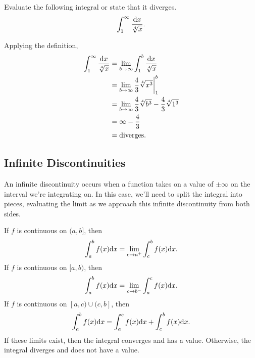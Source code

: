 \begin{example}
	Evaluate the following integral or state that it diverges.
	\begin{equation*}
		\int_{1}^{\infty}{\frac{\mathrm{d} x}{\sqrt[4]{x}}}.
	\end{equation*}
\end{example}
\begin{answer}
	Applying the definition,
	\begin{align*}
		\int_{1}^{\infty}{\frac{\mathrm{d} x}{\sqrt[4]{x}}} &= \lim_{b\to\infty}{\int_{1}^{b}{\frac{\mathrm{d} x}{\sqrt[4]{x}}}} \\
		&= \lim_{b\to\infty}{\frac{4}{3}\sqrt[4]{x^3}\biggr\rvert_{1}^{b}} \\
		&= \lim_{b\to\infty}{\frac{4}{3}\sqrt[4]{b^3}} - \frac{4}{3}\sqrt[4]{1^3} \\
		&= \infty - \frac{4}{3} \\
		&= \text{diverges}.
	\end{align*}
\end{answer}

\subsection{Infinite Discontinuities}
An infinite discontinuity occurs when a function takes on a value of $\pm\infty$ on the interval we're integrating on.
In this case, we'll need to split the integral into pieces, evaluating the limit as we approach this infinite discontinuity from both sides.
\begin{definition}
	If $f$ is continuous on $(a,b]$, then
	\begin{equation*}
		\int_{a}^{b}{f(x)\mathrm{d} x} = \lim_{c\to a^+}{\int_{c}^{b}{f(x)\mathrm{d} x}}.
	\end{equation*}
	If $f$ is continuous on $[a,b)$, then
	\begin{equation*}
		\int_{a}^{b}{f(x)\mathrm{d} x} = \lim_{c\to b^-}{\int_{a}^{c}{f(x)\mathrm{d} x}}.
	\end{equation*}
	If $f$ is continuous on $[a,c) \cup (c,b]$, then
	\begin{equation*}
		\int_{a}^{b}{f(x)\mathrm{d} x} = \int_{a}^{c}{f(x)\mathrm{d} x} + \int_{c}^{b}{f(x)\mathrm{d} x}.
	\end{equation*}
	If these limits exist, then the integral converges and has a value.
	Otherwise, the integral diverges and does not have a value.
\end{definition}

